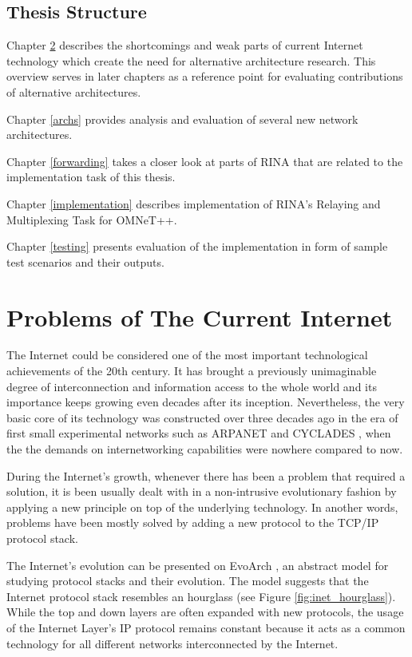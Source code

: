     \section{Thesis Structure}

        Chapter \ref{problems} describes the shortcomings and weak parts of current Internet technology which create the need for alternative architecture research. This overview serves in later chapters as a reference point for evaluating contributions of alternative architectures.

        Chapter \ref{archs} provides analysis and evaluation of several new network architectures.

        Chapter \ref{forwarding} takes a closer look at parts of RINA that are related to the implementation task of this thesis.

        Chapter \ref{implementation} describes implementation of RINA's Relaying and Multiplexing Task for OMNeT++.

        Chapter \ref{testing} presents evaluation of the implementation in form of sample test scenarios and their outputs.


\chapter{Problems of The Current Internet}\label{problems}

    The Internet could be considered one of the most important technological achievements of the 20th century. It has brought a previously unimaginable degree of interconnection and information access to the whole world and its importance keeps growing even decades after its inception. Nevertheless, the very basic core of its technology was constructed over three decades ago in the era of first small experimental networks such as ARPANET and CYCLADES \cite{Kurose}, when the the demands on internetworking capabilities were nowhere compared to now.

    During the Internet's growth, whenever there has been a problem that required a solution, it is been usually dealt with in a non-intrusive evolutionary fashion by applying a new principle on top of the underlying technology. In another words, problems have been mostly solved by adding a new protocol to the TCP/IP protocol stack.

    The Internet's evolution can be presented on EvoArch \cite{EvoArch}, an abstract model for studying protocol stacks and their evolution. The model suggests that the Internet protocol stack resembles an hourglass (see Figure \ref{fig:inet_hourglass}). While the top and down layers are often expanded with new protocols, the usage of the Internet Layer's IP protocol remains constant because it acts as a common technology for all different networks interconnected by the Internet.

